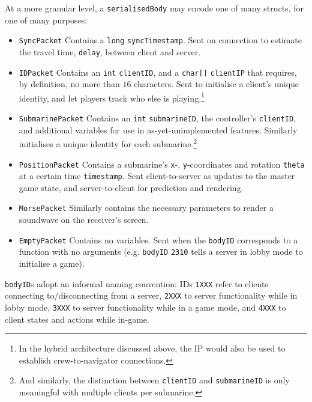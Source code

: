 \documentclass[a4paper, 10pt]{article}
\begin{document}
\begin{flushleft}
\vspace{5pt}\noindent
At a more granular level, a \texttt{serialisedBody} may encode one of many structs, for one of many purposes:
\begin{itemize}[noitemsep]
\item \texttt{SyncPacket} Contains a \texttt{long} \texttt{syncTimestamp}. Sent on connection to estimate the travel time, \texttt{delay}, between client and server.
\item \texttt{IDPacket} Contains an \texttt{int} \texttt{clientID}, and a \texttt{char[]} \texttt{clientIP} that requires, by definition, no more than $16$ characters. Sent to initialise a client's unique identity, and let players track who else is playing.\footnote{In the hybrid architecture discussed above, the IP would also be used to establish crew-to-navigator connections.}
\item \texttt{SubmarinePacket} Contains an \texttt{int} \texttt{submarineID}, the controller's \texttt{clientID}, and additional variables for use in as-yet-unimplemented features. Similarly initialises a unique identity for each submarine.\footnote{And similarly, the distinction between \texttt{clientID} and \texttt{submarineID} is only meaningful with multiple clients per submarine.}
\item \texttt{PositionPacket} Contains a submarine's \texttt{x}-, \texttt{y}-coordinates and rotation \texttt{theta} at a certain time \texttt{timestamp}. Sent client-to-server as updates to the master game state, and server-to-client for prediction and rendering.
\item \texttt{MorsePacket} Similarly contains the necessary parameters to render a soundwave on the receiver's screen.
\item \texttt{EmptyPacket} Contains no variables. Sent when the \texttt{bodyID} corresponds to a function with no arguments (e.g. \texttt{bodyID} \texttt{2310} tells a server in lobby mode to initialise a game).
\end{itemize}
\texttt{bodyID}s adopt an informal naming convention: IDs \texttt{1XXX} refer to clients connecting to/disconnecting from a server, \texttt{2XXX} to server functionality while in lobby mode, \texttt{3XXX} to server functionality while in a game mode, and \texttt{4XXX} to client states and actions while in-game.


\end{flushleft}
\end{document}
